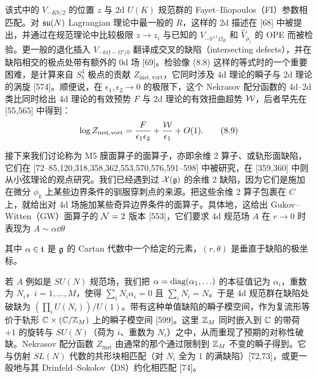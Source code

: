 该式中的 $V_{-Kb/2}$ 的位置 $z$ 与 2d $U(K)$ 规范群的 Fayet--Iliopoulos（FI）参数相匹配。对 $\mathfrak{su}(N)$ Lagrangian 理论中最一般的 $R$，这样的 2d 描述在 [68] 中被提出，并通过在规范理论中比较极限 $z\to z_i$ 与已知的 $V_{-b^{\pm1}\Omega_R}$ 和 $\hat V_{\mu_i}$ 的 OPE 而被检验。更一般的退化插入 $V_{-b\Omega-\Omega'/b}$ 翻译成交叉的缺陷（intersecting defects），并在缺陷相交的极点处带有额外的 0d 场 [69]。检验像 (8.8) 这样的等式时的一个重要困难，是计算来自 $S^4_b$ 极点的贡献 $Z_{\mathrm{inst,vort}}$，它同时涉及 4d 理论的瞬子与 2d 理论的涡旋 [574]。顺便说，在 $\epsilon_1,\epsilon_2\to0$ 的极限下，这个 Nekrasov 配分函数的 4d--2d 类比同时给出 4d 理论的有效预势 $F$ 与 2d 理论的有效扭曲超势 $\mathcal{W}$，后者早先在 [55,565] 中得到：
\begin{equation}
    \log Z_{\mathrm{inst,vort}}=\frac{F}{\epsilon_1\epsilon_2}+\frac{\mathcal{W}}{\epsilon_1}+O(1).
    \tag{8.9}
\end{equation}

 接下来我们讨论称为 M5 膜面算子的面算子，亦即余维 2 算子、或轨形面缺陷，它们在 [72--85,120,318,358,362,553,570,576,591--598] 中被研究，在 [359,360] 中则从小弦理论的观点研究。我们已经遇到过 $\mathcal{X}(\mathfrak{g})$ 的余维 2 缺陷，因为它们是施加在微分 $\phi_k$ 上某些边界条件的驯服穿刺点的来源。把这些余维 2 算子包裹在 $C$ 上，就给出对 4d 场施加某些奇异边界条件的面算子。具体地，这给出 Gukov--Witten（GW）面算子的 $\mathcal{N}=2$ 版本 [553]，它们要求 4d 规范场 $A$ 在 $r\to0$ 时表现为 $A\sim\alpha\dd\theta$

其中 $\alpha\in\mathfrak{t}$ 是 $\mathfrak{g}$ 的 Cartan 代数中一个给定的元素，$(r,\theta)$ 是垂直于缺陷的极坐标。

若 $A$ 例如是 $SU(N)$ 规范场，我们把 $\alpha=\operatorname{diag}(\alpha_1,\ldots)$ 的本征值记为 $\alpha_i$，重数为 $N_i$，$i=1,\ldots,M$，使得 $\sum_i N_i\alpha_i=0$ 且 $\sum_i N_i=N$。于是 4d 规范群在缺陷处破缺为 $(\prod_i U(N_i))/U(1)$。带有这种单值缺陷的瞬子模空间，作为复流形等价于轨形 $\mathbb{C}\times(\mathbb{C}/\mathbb{Z}_M)$ 上的瞬子模空间 [599]。这里 $\mathbb{Z}_M$ 同时嵌入到 $\mathbb{C}$ 的带荷 $+1$ 的旋转与 $SU(N)$（荷为 $i$、重数为 $N_i$）之中，从而重现了预期的对称性破缺。Nekrasov 配分函数 $Z_{\mathrm{inst}}$ 由通常的那个通过限制到 $\mathbb{Z}_M$ 不变的瞬子得到。它与仿射 $SL(N)$ 代数的共形块相匹配（对 $N_i$ 全为 1 的满缺陷）[72,73]，或更一般地与其 Drinfeld--Sokolov（DS）约化相匹配 [74]。

